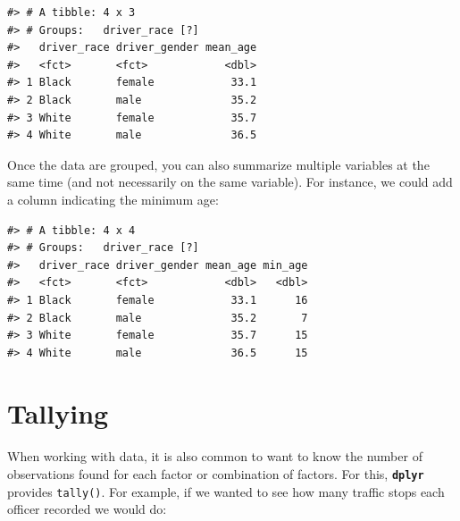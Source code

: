 \documentclass[]{book}
\newenvironment{Shaded}{\begin{snugshade}}{\end{snugshade}}
\newcommand{\KeywordTok}[1]{\textcolor[rgb]{0.13,0.29,0.53}{\textbf{#1}}}
\newcommand{\DataTypeTok}[1]{\textcolor[rgb]{0.13,0.29,0.53}{#1}}
\newcommand{\StringTok}[1]{\textcolor[rgb]{0.31,0.60,0.02}{#1}}
\newcommand{\OtherTok}[1]{\textcolor[rgb]{0.56,0.35,0.01}{#1}}
\newcommand{\OperatorTok}[1]{\textcolor[rgb]{0.81,0.36,0.00}{\textbf{#1}}}
\newcommand{\NormalTok}[1]{#1}
\theoremstyle{definition}
\theoremstyle{definition}
\theoremstyle{definition}
\theoremstyle{remark}
\begin{document}
\begin{verbatim}
#> # A tibble: 4 x 3
#> # Groups:   driver_race [?]
#>   driver_race driver_gender mean_age
#>   <fct>       <fct>            <dbl>
#> 1 Black       female            33.1
#> 2 Black       male              35.2
#> 3 White       female            35.7
#> 4 White       male              36.5
\end{verbatim}

Once the data are grouped, you can also summarize multiple variables at
the same time (and not necessarily on the same variable). For instance,
we could add a column indicating the minimum age:

\begin{Shaded}
\end{Shaded}

\begin{verbatim}
#> # A tibble: 4 x 4
#> # Groups:   driver_race [?]
#>   driver_race driver_gender mean_age min_age
#>   <fct>       <fct>            <dbl>   <dbl>
#> 1 Black       female            33.1      16
#> 2 Black       male              35.2       7
#> 3 White       female            35.7      15
#> 4 White       male              36.5      15
\end{verbatim}

\section{Tallying}\label{tallying}

When working with data, it is also common to want to know the number of
observations found for each factor or combination of factors. For this,
\textbf{\texttt{dplyr}} provides \texttt{tally()}. For example, if we
wanted to see how many traffic stops each officer recorded we would do:

\begin{Shaded}
\end{Shaded}
\end{document}
